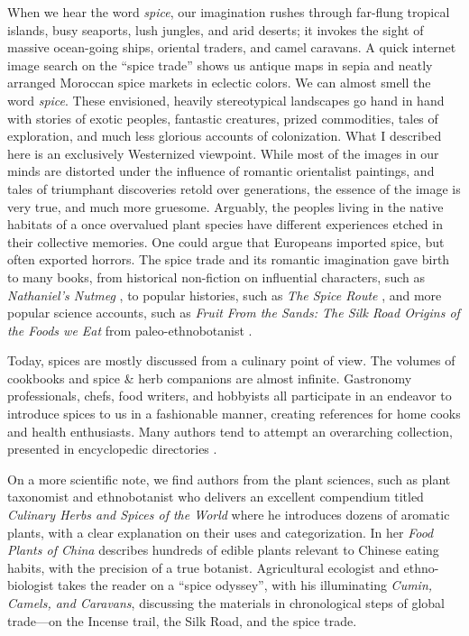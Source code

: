 When we hear the word \textit{spice}, our imagination rushes through far-flung tropical islands, busy seaports, lush jungles, and arid deserts; it invokes the sight of massive ocean-going ships, oriental traders, and camel caravans. A quick internet image search on the ``spice trade'' shows us antique maps in sepia and neatly arranged Moroccan spice markets in eclectic colors. We can almost smell the word \textit{spice}. These envisioned, heavily stereotypical landscapes go hand in hand with stories of exotic peoples, fantastic creatures, prized commodities, tales of exploration, and much less glorious accounts of colonization. What I described here is an exclusively Westernized viewpoint. While most of the images in our minds are distorted under the influence of romantic orientalist paintings, and tales of triumphant discoveries retold over generations, the essence of the image is very true, and much more gruesome. Arguably, the peoples living in the native habitats of a once overvalued plant species have different experiences etched in their collective memories. One could argue that Europeans imported spice, but often exported horrors. The spice trade and its romantic imagination gave birth to many books, from historical non-fiction on influential characters, such as \textit{Nathaniel's Nutmeg} \autocite{milton_nathaniels_1999}, to popular histories, such as \textit{The Spice Route} \autocite{keay_spice_2006}, and more popular science accounts, such as \textit{Fruit From the Sands: The Silk Road Origins of the Foods we Eat} from paleo-ethnobotanist \textcite{spengler_fruit_2019}. 

Today, spices are mostly discussed from a culinary point of view. The volumes of cookbooks and spice \& herb companions are almost infinite. Gastronomy professionals, chefs, food writers, and hobbyists all participate in an endeavor to introduce spices to us in a fashionable manner, creating references for home cooks and health enthusiasts. Many authors tend to attempt an overarching collection, presented in encyclopedic directories \autocite{farrell_spices_1985,craze_spice_1997,herman_herb_2015,norman_herbs_2015,lakshmi_encyclopedia_2016,oconnell_book_2016,opara_culinary_2021}. 

On a more scientific note, we find authors from the plant sciences, such as plant taxonomist and ethnobotanist \textcite{van_wyk_culinary_2014} who delivers an excellent compendium titled \textit{Culinary Herbs and Spices of the World} where he introduces dozens of aromatic plants, with a clear explanation on their uses and categorization. In her \textit{Food Plants of China} \textcite{hu_food_2005} describes hundreds of edible plants relevant to Chinese eating habits, with the precision of a true botanist. Agricultural ecologist and ethno-biologist \textcite{nabhan_cumin_2014} takes the reader on a ``spice odyssey'', with his illuminating \textit{Cumin, Camels, and Caravans}, discussing the materials in chronological steps of global trade---on the Incense trail, the Silk Road, and the spice trade.

